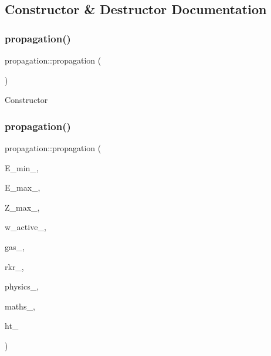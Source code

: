 \subsection{Constructor \& Destructor Documentation}
\mbox{\label{classpropagation_a9d7b9f42ce1c0bc741d3016a07ba13f7}} 
\subsubsection{\texorpdfstring{propagation()}{propagation()}\hspace{0.1cm}{\footnotesize\ttfamily [1/2]}}
{\footnotesize\ttfamily propagation\+::propagation (\begin{DoxyParamCaption}{ }\end{DoxyParamCaption})}

Constructor \mbox{\label{classpropagation_a082efa11767639ade0eaf0f8856cc410}} 
\subsubsection{\texorpdfstring{propagation()}{propagation()}\hspace{0.1cm}{\footnotesize\ttfamily [2/2]}}
{\footnotesize\ttfamily propagation\+::propagation (\begin{DoxyParamCaption}\item[{double}]{E\+\_\+min\+\_\+,  }\item[{double}]{E\+\_\+max\+\_\+,  }\item[{double}]{Z\+\_\+max\+\_\+,  }\item[{Eigen\+::\+Array\+Xd}]{w\+\_\+active\+\_\+,  }\item[{\hyperlink{classkeldysh__gas}{keldysh\+\_\+gas} \&}]{gas\+\_\+,  }\item[{\hyperlink{classgrid__rkr}{grid\+\_\+rkr} \&}]{rkr\+\_\+,  }\item[{\hyperlink{classphysics__textbook}{physics\+\_\+textbook} \&}]{physics\+\_\+,  }\item[{\hyperlink{classmaths__textbook}{maths\+\_\+textbook} \&}]{maths\+\_\+,  }\item[{\hyperlink{class_d_h_t}{D\+HT} \&}]{ht\+\_\+ }\end{DoxyParamCaption})}



